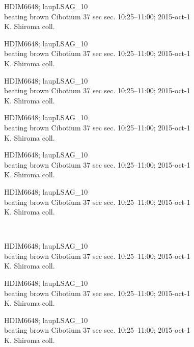 \documentclass[2pt]{extarticle}
\begin{document}
\noindent
\parbox{0.16\textwidth}{\tiny \raggedright \rule[-0.3\baselineskip]{0pt}{10pt}HDIM6648; laupLSAG\_10\\ beating brown Cibotium 37 sec sec. 10:25--11:00; 2015-oct-1\\ K. Shiroma coll.}
\parbox{0.16\textwidth}{\tiny \raggedright \rule[-0.3\baselineskip]{0pt}{10pt}HDIM6648; laupLSAG\_10\\ beating brown Cibotium 37 sec sec. 10:25--11:00; 2015-oct-1\\ K. Shiroma coll.}
\parbox{0.16\textwidth}{\tiny \raggedright \rule[-0.3\baselineskip]{0pt}{10pt}HDIM6648; laupLSAG\_10\\ beating brown Cibotium 37 sec sec. 10:25--11:00; 2015-oct-1\\ K. Shiroma coll.}
\parbox{0.16\textwidth}{\tiny \raggedright \rule[-0.3\baselineskip]{0pt}{10pt}HDIM6648; laupLSAG\_10\\ beating brown Cibotium 37 sec sec. 10:25--11:00; 2015-oct-1\\ K. Shiroma coll.}
\parbox{0.16\textwidth}{\tiny \raggedright \rule[-0.3\baselineskip]{0pt}{10pt}HDIM6648; laupLSAG\_10\\ beating brown Cibotium 37 sec sec. 10:25--11:00; 2015-oct-1\\ K. Shiroma coll.}
\parbox{0.16\textwidth}{\tiny \raggedright \rule[-0.3\baselineskip]{0pt}{10pt}HDIM6648; laupLSAG\_10\\ beating brown Cibotium 37 sec sec. 10:25--11:00; 2015-oct-1\\ K. Shiroma coll.} \\ 
\vspace{0.001in} 

\noindent
\parbox{0.16\textwidth}{\tiny \raggedright \rule[-0.3\baselineskip]{0pt}{10pt}HDIM6648; laupLSAG\_10\\ beating brown Cibotium 37 sec sec. 10:25--11:00; 2015-oct-1\\ K. Shiroma coll.}
\parbox{0.16\textwidth}{\tiny \raggedright \rule[-0.3\baselineskip]{0pt}{10pt}HDIM6648; laupLSAG\_10\\ beating brown Cibotium 37 sec sec. 10:25--11:00; 2015-oct-1\\ K. Shiroma coll.}
\parbox{0.16\textwidth}{\tiny \raggedright \rule[-0.3\baselineskip]{0pt}{10pt}HDIM6648; laupLSAG\_10\\ beating brown Cibotium 37 sec sec. 10:25--11:00; 2015-oct-1\\ K. Shiroma coll.}
\end{document}
